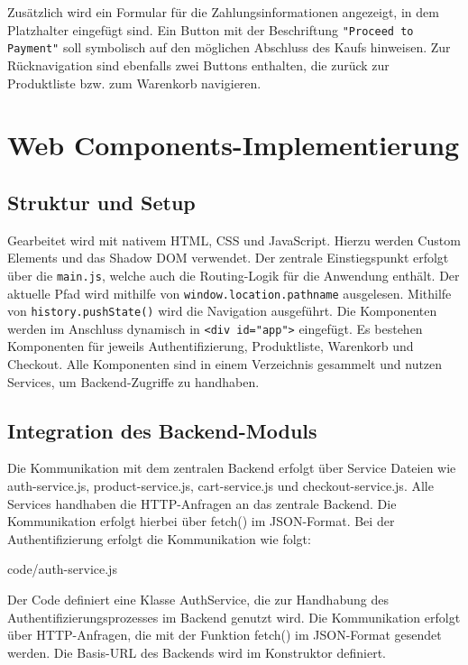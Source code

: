 \documentclass[oneside]{ausarbeitung}
\begin{document}
Zusätzlich wird ein Formular für die Zahlungsinformationen angezeigt, in dem Platzhalter eingefügt sind. Ein Button mit der Beschriftung \texttt{"Proceed to Payment"} soll symbolisch auf den möglichen Abschluss des Kaufs hinweisen.
Zur Rücknavigation sind ebenfalls zwei Buttons enthalten, die zurück zur Produktliste bzw. zum Warenkorb navigieren.

\section{Web Components-Implementierung}

\subsection{Struktur und Setup}

Gearbeitet wird mit nativem HTML, CSS und JavaScript. Hierzu werden Custom Elements und das Shadow DOM verwendet. Der zentrale Einstiegspunkt erfolgt über die \texttt{main.js}, welche auch die Routing-Logik für die Anwendung enthält. Der aktuelle Pfad wird mithilfe von \texttt{window.location.pathname} ausgelesen. Mithilfe von \texttt{history.pushState()} wird die Navigation ausgeführt. Die Komponenten werden im Anschluss dynamisch in \texttt{<div id="app">} eingefügt. Es bestehen Komponenten für jeweils Authentifizierung, Produktliste, Warenkorb und Checkout. Alle Komponenten sind in einem Verzeichnis gesammelt und nutzen Services, um Backend-Zugriffe zu handhaben.

\subsection{Integration des Backend-Moduls}

Die Kommunikation mit dem zentralen Backend erfolgt über Service Dateien wie auth-service.js, product-service.js, cart-service.js und checkout-service.js. 
Alle Services handhaben die HTTP-Anfragen an das zentrale Backend. Die Kommunikation erfolgt hierbei über fetch() im JSON-Format. 
Bei der Authentifizierung erfolgt die Kommunikation wie folgt: 

 {code/auth-service.js}

Der Code definiert eine Klasse AuthService, die zur Handhabung des Authentifizierungsprozesses im Backend genutzt wird. Die Kommunikation erfolgt über HTTP-Anfragen, die mit der Funktion fetch() im JSON-Format gesendet werden. Die Basis-URL des Backends wird im Konstruktor definiert. 
\end{document}

